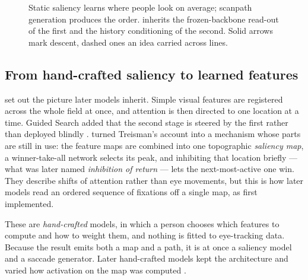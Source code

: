 \begin{figure}[tbp]
  \caption[Two lines of work, and where they meet]{Static saliency learns where people look on average; scanpath generation produces the order.
    \dg{} inherits the frozen-backbone read-out of the first and the history conditioning of the
    second. Solid arrows mark descent, dashed ones an idea carried across lines.}
  \label{fig:lineage}
\end{figure}

\subsection{From hand-crafted saliency to learned features}
\label{subsec:saliency-lineage}

\citet{treisman1980feature} set out the picture later models inherit. Simple
visual features are registered across the whole field at once, and attention is then
directed to one location at a time. Guided Search added that the second stage is steered
by the first rather than deployed blindly \citep{wolfe1989guided}.
\citet{koch1985shifts} turned Treisman's account into a mechanism whose parts are still in use: the
feature maps are combined into one topographic \emph{saliency map}, a winner-take-all
network selects its peak, and inhibiting that location briefly --- what was later named
\emph{inhibition of return} --- lets the next-most-active one win. They describe shifts of
attention rather than eye movements, but this is how later models read an ordered
sequence of fixations off a single map, as \citet{itti1998saliency} first implemented.

These are \emph{hand-crafted} models, in which a person chooses which features to compute and how
to weight them, and nothing is fitted to eye-tracking data. Because the
result emits both a map and a path, it is at once a saliency model and a saccade
generator. Later hand-crafted models kept the architecture and varied how activation
on the map was computed \citep{harel2006gbvs, bruce2009saliency, zhang2008sun}.

